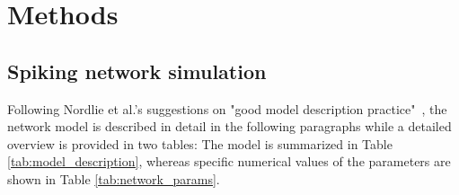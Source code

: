 \section{Methods}
\label{sec:methods}

\subsection{Spiking network simulation}
\label{sub:methods_simulation}
Following Nordlie et al.'s suggestions on 
"good model description practice"~\cite{nordlie2009},
the network model is described in detail in the following paragraphs while a detailed 
overview is provided in two tables: The model is summarized in Table 
\ref{tab:model_description}, 
whereas specific numerical values of the parameters are shown in Table 
\ref{tab:network_params}. 

